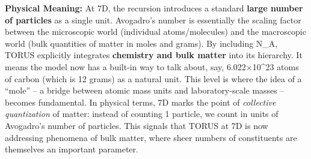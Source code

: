 \documentclass[]{article}
\begin{document}
\textbf{Physical Meaning:} At 7D, the recursion introduces a standard
\textbf{large number of particles} as a single unit. Avogadro's number
is essentially the scaling factor between the microscopic world
(individual atoms/molecules) and the macroscopic world (bulk quantities
of matter in moles and grams)​. By including N\_A, TORUS explicitly
integrates \textbf{chemistry and bulk matter} into its hierarchy. It
means the model now has a built-in way to talk about, say,
6.022×10\^{}23 atoms of carbon (which is 12 grams) as a natural unit.
This level is where the idea of a ``mole'' -- a bridge between atomic
mass units and laboratory-scale masses -- becomes fundamental. In
physical terms, 7D marks the point of \emph{collective quantization} of
matter: instead of counting 1 particle, we count in units of Avogadro's
number of particles. This signals that TORUS at 7D is now addressing
phenomena of bulk matter, where sheer numbers of constituents are
themselves an important parameter.
\end{document}
